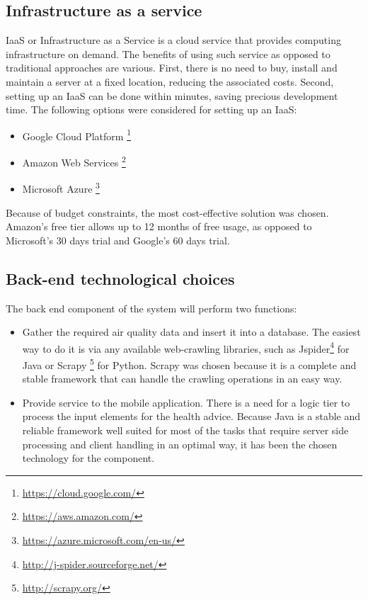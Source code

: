 \subsection{Infrastructure as a service}

IaaS or Infrastructure as a Service is a cloud service that provides computing infrastructure on demand. The benefits of using such service as opposed to traditional approaches are various. First, there is no need to buy, install and maintain a server at a fixed location, reducing the associated costs. Second, setting up an IaaS can be done within minutes, saving precious development time. The following options were considered for setting up an IaaS: 

\begin{itemize}
	\item Google Cloud Platform \footnote{\url{https://cloud.google.com/}}
    \item Amazon Web Services \footnote{\url{https://aws.amazon.com/}}
    \item Microsoft Azure \footnote{\url{https://azure.microsoft.com/en-us/}}
\end{itemize}

Because of budget constraints, the most cost-effective solution was chosen. Amazon's free tier allows up to 12 months of free usage, as opposed to Microsoft's 30 days trial and Google's 60 days trial.

\subsection{Back-end technological choices}
The back end component of the system will perform two functions: 

\begin{itemize}
	\item Gather the required air quality data and insert it into a database. The easiest way to do it is via any available web-crawling libraries, such as Jspider\footnote{\url{http://j-spider.sourceforge.net/}} for Java or Scrapy \footnote{\url{http://scrapy.org/}} for Python. Scrapy was chosen because it is a complete and stable framework that can handle the crawling operations in an easy way. 
	\item Provide service to the mobile application. There is a need for a logic tier to process the input elements for the health advice. Because Java is a stable and reliable framework well suited for most of the tasks that require server side processing and client handling in an optimal way, it has been the chosen technology for the component. 
\end{itemize}

